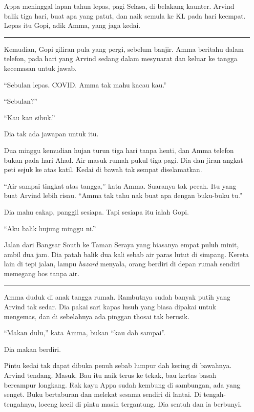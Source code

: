 \documentclass[
  11pt,
  a5paper,
  openany,
  oneside]{book}
\begin{document}
Appa meninggal lapan tahun lepas, pagi Selasa, di belakang kaunter.
Arvind balik tiga hari, buat apa yang patut, dan naik semula ke KL pada
hari keempat. Lepas itu Gopi, adik Amma, yang jaga kedai.

\begin{center}\rule{0.5\linewidth}{0.5pt}\end{center}

Kemudian, Gopi giliran pula yang pergi, sebelum banjir. Amma beritahu
dalam telefon, pada hari yang Arvind sedang dalam mesyuarat dan keluar
ke tangga kecemasan untuk jawab.

``Sebulan lepas. COVID. Amma tak mahu kacau kau.''

``Sebulan?''

``Kau kan sibuk.''

Dia tak ada jawapan untuk itu.

Dua minggu kemudian hujan turun tiga hari tanpa henti, dan Amma telefon
bukan pada hari Ahad. Air masuk rumah pukul tiga pagi. Dia dan jiran
angkat peti sejuk ke atas katil. Kedai di bawah tak sempat diselamatkan.

``Air sampai tingkat atas tangga,'' kata Amma. Suaranya tak pecah. Itu
yang buat Arvind lebih risau. ``Amma tak tahu nak buat apa dengan
buku-buku tu.''

Dia mahu cakap, panggil sesiapa. Tapi sesiapa itu ialah Gopi.

``Aku balik hujung minggu ni.''

Jalan dari Bangsar South ke Taman Seraya yang biasanya empat puluh
minit, ambil dua jam. Dia patah balik dua kali sebab air paras lutut di
simpang. Kereta lain di tepi jalan, lampu \emph{hazard} menyala, orang
berdiri di depan rumah sendiri memegang hos tanpa air.

\begin{center}\rule{0.5\linewidth}{0.5pt}\end{center}

Amma duduk di anak tangga rumah. Rambutnya sudah banyak putih yang
Arvind tak sedar. Dia pakai sari kapas lusuh yang biasa dipakai untuk
mengemas, dan di sebelahnya ada pinggan thosai tak berusik.

``Makan dulu,'' kata Amma, bukan ``kau dah sampai''.

Dia makan berdiri.

Pintu kedai tak dapat dibuka penuh sebab lumpur dah kering di bawahnya.
Arvind tendang. Masuk. Bau itu naik terus ke tekak, bau kertas basah
bercampur longkang. Rak kayu Appa sudah kembung di sambungan, ada yang
senget. Buku bertaburan dan melekat sesama sendiri di lantai. Di
tengah-tengahnya, loceng kecil di pintu masih tergantung. Dia sentuh dan
ia berbunyi.
\end{document}
